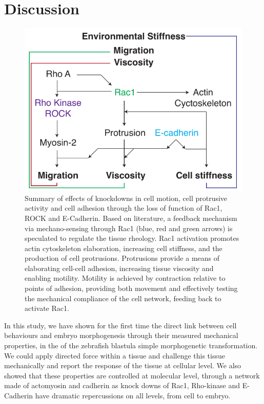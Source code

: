 \section{Discussion}

\begin{figure}
  \centering
  \includegraphics{Chapters/tweezers/Figs/PDF/interconnected_protein_signalling}
  \caption{Summary of effects of knockdowns in cell motion, cell protrusive activity and cell adhesion through the loss of function of Rac1, ROCK and E-Cadherin.
  Based on literature, a feedback mechanism via mechano-sensing through Rac1 (blue, red and green arrows) is speculated to regulate the tissue rheology.
  Rac1 activation promotes actin cytoskeleton elaboration, increasing cell stiffness, and the production of cell protrusions.
  Protrusions provide a means of elaborating cell-cell adhesion, increasing tissue viscosity and enabling motility.
  Motility is achieved by contraction relative to points of adhesion, providing both movement and effectively testing the mechanical compliance of the cell network, feeding back to activate Rac1.
  }
  \label{fig:interconnected_protein_signalling}
\end{figure}
In this study, we have shown for the first time the direct link between cell behaviours and embryo morphogenesis through their measured mechanical properties, in the of the zebrafish blastula simple morphogenetic transformation. %
We could apply directed force within a tissue and challenge this tissue mechanically and report the response of the tissue at cellular level.
We also showed that these properties are controlled at molecular level, through a network made of actomyosin and cadherin as knock downs of Rac1, Rho-kinase and E-Cadherin have dramatic repercussions on all levels, from cell to embryo.

